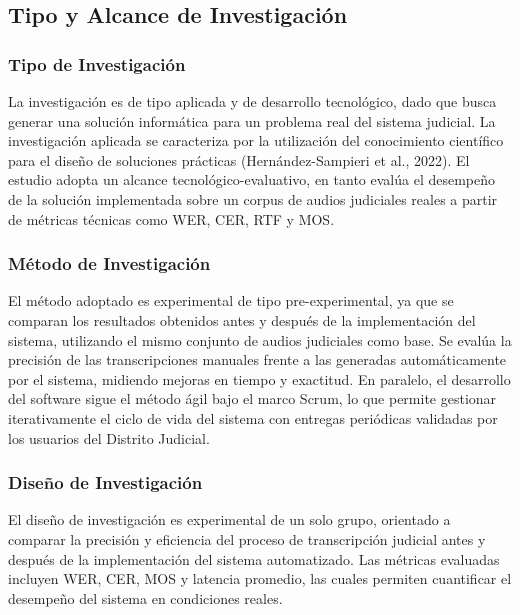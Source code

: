 \documentclass[12pt,a4paper,oneside]{article}
\begin{document}
\subsection{Tipo y Alcance de Investigaci\'on}

\subsubsection{Tipo de Investigaci\'on}

La investigaci\'on es de tipo aplicada y de desarrollo tecnol\'ogico, dado que busca generar una soluci\'on inform\'atica para un problema real del sistema judicial. La investigaci\'on aplicada se caracteriza por la utilizaci\'on del conocimiento cient\'ifico para el dise\~no de soluciones pr\'acticas (Hern\'andez-Sampieri et al., 2022). El estudio adopta un alcance tecnol\'ogico-evaluativo, en tanto eval\'ua el desempe\~no de la soluci\'on implementada sobre un corpus de audios judiciales reales a partir de m\'etricas t\'ecnicas como WER, CER, RTF y MOS.

\subsubsection{M\'etodo de Investigaci\'on}

El m\'etodo adoptado es experimental de tipo pre-experimental, ya que se comparan los resultados obtenidos antes y despu\'es de la implementaci\'on del sistema, utilizando el mismo conjunto de audios judiciales como base. Se eval\'ua la precisi\'on de las transcripciones manuales frente a las generadas autom\'aticamente por el sistema, midiendo mejoras en tiempo y exactitud. En paralelo, el desarrollo del software sigue el m\'etodo \'agil bajo el marco Scrum, lo que permite gestionar iterativamente el ciclo de vida del sistema con entregas peri\'odicas validadas por los usuarios del Distrito Judicial.

\subsubsection{Dise\~no de Investigaci\'on}

El dise\~no de investigaci\'on es experimental de un solo grupo, orientado a comparar la precisi\'on y eficiencia del proceso de transcripci\'on judicial antes y despu\'es de la implementaci\'on del sistema automatizado. Las m\'etricas evaluadas incluyen WER, CER, MOS y latencia promedio, las cuales permiten cuantificar el desempe\~no del sistema en condiciones reales.
\end{document}
